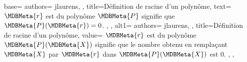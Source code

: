{
  base={
    authors={
      jlaurens,
    },
    title=Définition de racine d'un polynôme,
    text={
\(\MDBMeta{r}\) est  du polynôme \(\MDBMeta{P}\) signifie que \(\MDBMeta{P}(\MDBMeta{r})=0\).
    },
  },
  alt1={
    authors={
      jlaurens,
    },
    title=Définition de racine d'un polynôme,
    value={
\(\MDBMeta{r}\) est  du polynôme \(\MDBMeta{P}(\MDBMeta{X})\) signifie que le nombre obtenu en remplaçant \(\MDBMeta{X}\) par \(\MDBMeta{r}\) dans \(\MDBMeta{P}(\MDBMeta{X})\) est \(0\).
    },
  },
}
